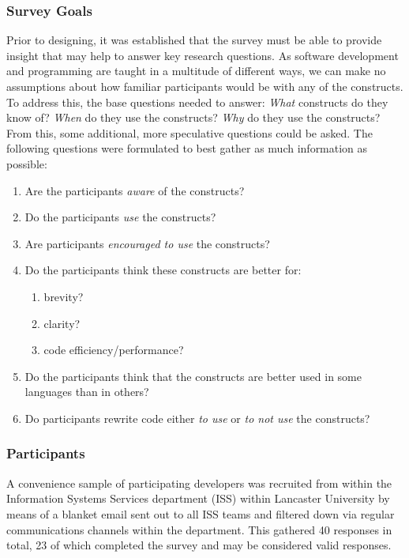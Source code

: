 \documentclass{article}
\begin{document}
        \newpage
        \subsubsection{Survey Goals}
        \label{subsubsec:surveyGoal}
            Prior to designing, it was established that the survey must be able to provide insight that may help to answer key research questions. As software development and programming are taught in a multitude of different ways, we can make no assumptions about how familiar participants would be with any of the constructs. To address this, the base questions needed to answer: \emph{What} constructs do they know of? \emph{When} do they use the constructs? \emph{Why} do they use the constructs? From this, some additional, more speculative questions could be asked. The following questions were formulated to best gather as much information as possible:

            \begin{enumerate}
                \item Are the participants \emph{aware} of the constructs?
                \item Do the participants \emph{use} the constructs?
                \item Are participants \emph{encouraged to use} the constructs?
                \item Do the participants think these constructs are better for:
                \begin{enumerate}
                    \item brevity?
                    \item clarity?
                    \item code efficiency/performance?
                \end{enumerate}  
                \item Do the participants think that the constructs are better used in some languages than in others?
                \item Do participants rewrite code either \emph{to use} or \emph{to not use} the constructs?
            \end{enumerate}
            
        \subsubsection{Participants}
            A convenience sample of participating developers was recruited from within the Information Systems Services department (ISS) within Lancaster University by means of a blanket email sent out to all ISS teams and filtered down via regular communications channels within the department. This gathered 40 responses in total, 23 of which completed the survey and may be considered valid responses.
            
\end{document}
